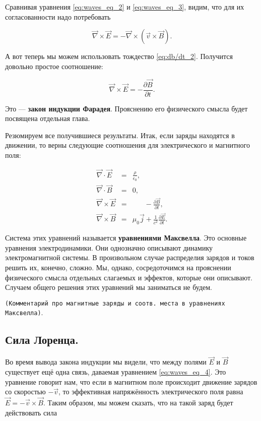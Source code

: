 \documentclass[a4paper,12pt]{article}
\newcommand{\pt}{\partial}
\newcommand{\eps}{\epsilon}
\newcommand{\com}[1]{{\Large{\texttt{{\color{red}(#1)}}}}}
\newcommand{\vn}{\vec{\nabla}}
\begin{document}
Сравнивая уравнения \eqref{eq:waves_eq_2} и \eqref{eq:waves_eq_3},
видим, что для их согласованности надо потребовать

\begin{equation}
  \label{eq:waves_eq_4}
  \vn \times \vec{E} = - \vn \times \left( \vec{v} \times \vec{B}  \right).
\end{equation}

А вот теперь мы можем использовать тождество
\eqref{eq:db/dt_2}. Получится довольно простое соотношение: 

\begin{equation}
  \label{eq:faradays_law}
  \vn \times \vec{E} = -\frac{\pt \vec{B}}{\pt t}.
\end{equation}

Это --- \textbf{закон индукции Фарадея}. Прояснению его физического
смысла будет посвящена отдельная глава. 

Резюмируем все получившиеся результаты. Итак, если заряды находятся в
движении, то верны следующие соотношения для электрического и
магнитного поля: 

\begin{eqnarray}
  \label{eq:maxwell_eqs}
  \vn \cdot \vec{E} &=& \frac{\rho}{\eps_0},\\
  \vn \cdot \vec{B} &=& 0,\\
  \vn \times \vec{E} &=& \phantom{\mu_0 \vec{j}} -\frac{\pt \vec{B}}{\pt t},\\
  \vn \times \vec{B} &=& \mu_0 \vec{j} + \frac{1}{c^2}\frac{\pt
    \vec{E}}{\pt t}.
\end{eqnarray}

Система этих уравнений называется \textbf{уравнениями Максвелла}. Это
основные уравнения электродинамики. Они однозначно описывают динамику
электромагнитной системы. В произвольном случае распределия зарядов и
токов решить их, конечно, сложно. Мы, однако, сосредоточимся на
прояснении физического смысла отдельных слагаемых и эффектов, которые
они описывают. Случаем общего решения этих уравнений мы заниматься не
будем. 

\com{Комментарий про магнитные заряды и соотв. места в уравнениях
  Максвелла}. 

\subsection{Сила Лоренца.}
\label{sec:lorentz_force}

Во время вывода закона индукции мы видели, что между полями $\vec{E}$
и $\vec{B}$ существует ещё одна связь, даваемая уравнением
\eqref{eq:waves_eq_4}. Это уравнение говорит нам, что если в магнитном
поле происходит движение зарядов со скоростью $-\vec{v}$, то
эффективная напряжённость электрического поля равна $\vec{E} =
-\vec{v} \times \vec{B}$. Таким образом, мы можем сказать, что на
такой заряд будет действовать сила
\end{document}

